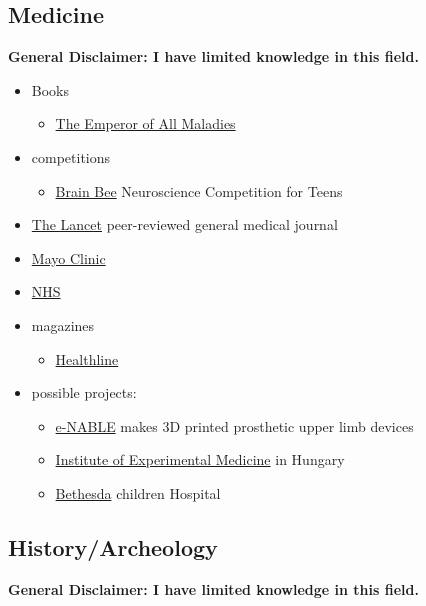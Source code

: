 \documentclass{article}
\begin{document}
\subsection{Medicine}
\textbf{General Disclaimer: I have limited knowledge in this field.}

\begin{itemize}
    \item Books
    \begin{itemize}
        \item \href{https://www.goodreads.com/book/show/7170627-the-emperor-of-all-maladies}{The Emperor of All Maladies}
    \end{itemize}
    \item competitions
    \begin{itemize}
        \item \href{https://thebrainbee.org/}{Brain Bee} Neuroscience Competition for Teens
    \end{itemize}
    \item \href{https://www.thelancet.com/}{The Lancet} peer-reviewed general medical journal
    \item \href{https://www.mayoclinic.org/}{Mayo Clinic}
    \item \href{https://www.nhs.uk/}{NHS} 
    \item magazines
    \begin{itemize}
        \item \href{https://www.healthline.com/}{Healthline}
    \end{itemize}
    \item possible projects:
    \begin{itemize}
        \item \href{https://enablingthefuture.org/}{e-NABLE} makes 3D printed prosthetic upper limb devices
        \item \href{http://koki.hu/english}{Institute of Experimental Medicine} in Hungary
        \item \href{https://www.bethesda.hu/about-us/}{Bethesda} children Hospital
    \end{itemize}
\end{itemize}

\subsection{History/Archeology}
\textbf{General Disclaimer: I have limited knowledge in this field.}
\end{document}
